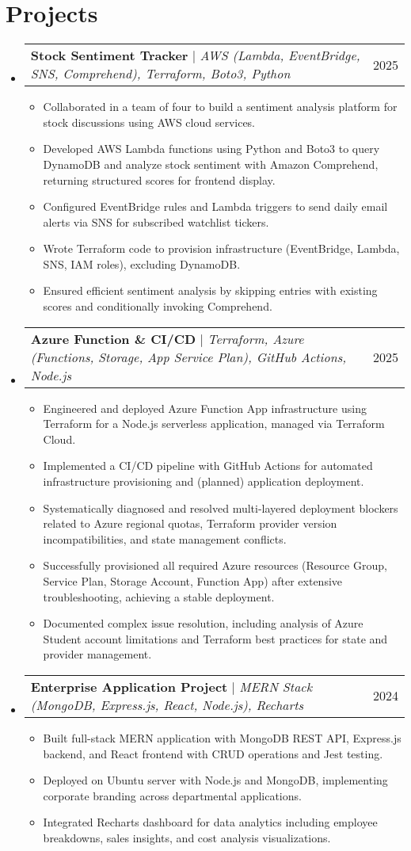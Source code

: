 \documentclass[letterpaper,11pt]{article}
\makeatletter
\newcommand{\resumeItem}[1]{
  \item\small{
    {#1 \vspace{-2pt}}
  }
}
\newcommand{\resumeProjectHeading}[2]{
    \item
    \begin{tabular*}{0.97\textwidth}{l@{\extracolsep{\fill}}r}
      \small#1 & #2 \\
    \end{tabular*}\vspace{-7pt}
}
\newcommand{\resumeSubHeadingListStart}{\begin{itemize}[leftmargin=0.15in, label={}]}
\newcommand{\resumeSubHeadingListEnd}{\end{itemize}}
\newcommand{\resumeItemListStart}{\begin{itemize}}
\newcommand{\resumeItemListEnd}{\end{itemize}\vspace{-5pt}}
\makeatother
\begin{document}
\section{Projects}
    \resumeSubHeadingListStart
    \resumeProjectHeading
        {\textbf{Stock Sentiment Tracker} $|$ \emph{AWS (Lambda, EventBridge, SNS, Comprehend), Terraform, Boto3, Python}}{2025}
        \resumeItemListStart
          \resumeItem{Collaborated in a team of four to build a sentiment analysis platform for stock discussions using AWS cloud services.}
          \resumeItem{Developed AWS Lambda functions using Python and Boto3 to query DynamoDB and analyze stock sentiment with Amazon Comprehend, returning structured scores for frontend display.}
          \resumeItem{Configured EventBridge rules and Lambda triggers to send daily email alerts via SNS for subscribed watchlist tickers.}
          \resumeItem{Wrote Terraform code to provision infrastructure (EventBridge, Lambda, SNS, IAM roles), excluding DynamoDB.}
          \resumeItem{Ensured efficient sentiment analysis by skipping entries with existing scores and conditionally invoking Comprehend.}
        \resumeItemListEnd
      \resumeProjectHeading
        {\textbf{Azure Function \& CI/CD} $|$ \emph{Terraform, Azure (Functions, Storage, App Service Plan), GitHub Actions, Node.js}}{2025}
        \resumeItemListStart
            \resumeItem{Engineered and deployed Azure Function App infrastructure using Terraform for a Node.js serverless application, managed via Terraform Cloud.}
            \resumeItem{Implemented a CI/CD pipeline with GitHub Actions for automated infrastructure provisioning and (planned) application deployment.}
            \resumeItem{Systematically diagnosed and resolved multi-layered deployment blockers related to Azure regional quotas, Terraform provider version incompatibilities, and state management conflicts.}
            \resumeItem{Successfully provisioned all required Azure resources (Resource Group, Service Plan, Storage Account, Function App) after extensive troubleshooting, achieving a stable deployment.}
            \resumeItem{Documented complex issue resolution, including analysis of Azure Student account limitations and Terraform best practices for state and provider management.}
        \resumeItemListEnd
      \resumeProjectHeading
          {\textbf{Enterprise Application Project} $|$ \emph{MERN Stack (MongoDB, Express.js, React, Node.js), Recharts}}{2024}
          \resumeItemListStart
            \resumeItem{Built full-stack MERN application with MongoDB REST API, Express.js backend, and React frontend with CRUD operations and Jest testing.}
            \resumeItem{Deployed on Ubuntu server with Node.js and MongoDB, implementing corporate branding across departmental applications.}
            \resumeItem{Integrated Recharts dashboard for data analytics including employee breakdowns, sales insights, and cost analysis visualizations.}
          \resumeItemListEnd
      \resumeSubHeadingListEnd 


\end{document}
